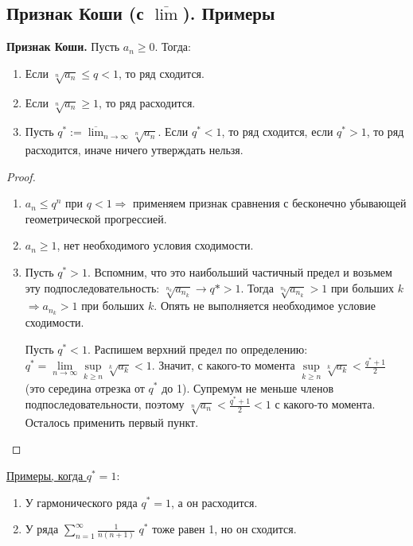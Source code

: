 \subsection{Признак Коши (с $\overline{\lim}$). Примеры}
\textbf{Признак Коши.} 
Пусть $a_n \geqslant 0$. Тогда:
\begin{enumerate}
    \item Если $\sqrt[n]{a_n} \leqslant q < 1$, то ряд сходится.
    \item Если $\sqrt[n]{a_n} \geqslant 1$, то ряд расходится.
    \item Пусть $q^* := \overline{\lim}_{n \to \infty} \sqrt[n]{a_n}$.
    Если $q^* < 1$, то ряд сходится, если $q^* > 1$, то ряд расходится, иначе ничего утверждать нельзя.
\end{enumerate}
\begin{proof} \quad

    \begin{enumerate}
        \item $a_n \leqslant q^n$ при $q < 1 \Rightarrow$ применяем признак сравнения с бесконечно убывающей геометрической прогрессией.
        \item $a_n \geqslant 1$, нет необходимого условия сходимости.
        \item Пусть $q^* > 1$. 
        Вспомним, что это наибольший частичный предел и возьмем эту подпоследовательность: $\sqrt[n_k]{a_{n_k}} \to q* > 1$.
        Тогда $\sqrt[n_k]{a_{n_k}} > 1$ при больших $k$ $\Rightarrow a_{n_k} > 1$ при больших $k$.
        Опять не выполняется необходимое условие сходимости.

        Пусть $q^* < 1$. 
        Распишем верхний предел по определению: $q^* = \lim\limits_{n \to \infty} \sup\limits_{k \geqslant n} \sqrt[k]{a_k} < 1$. 
        Значит, с какого-то момента $\sup\limits_{k \geqslant n} \sqrt[k]{a_k} < \frac{q^* + 1}{2}$ (это середина отрезка от $q^*$ до 1).
        Супремум не меньше членов подпоследовательности, поэтому $\sqrt[n]{a_n} < \frac{q^* + 1}{2} < 1$ с какого-то момента.
        Осталось применить первый пункт.
    \end{enumerate}
\end{proof}

\underline{Примеры, когда $q^* = 1:$}
\begin{enumerate}
    \item У гармонического ряда $q^* = 1$, а он расходится.
    \item У ряда $\sum\limits_{n=1}^{\infty} \frac{1}{n(n+1)}$ $q^*$ тоже равен 1, но он сходится. 
\end{enumerate}
